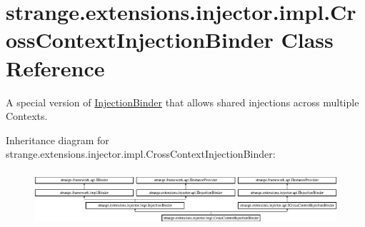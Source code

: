 \hypertarget{classstrange_1_1extensions_1_1injector_1_1impl_1_1_cross_context_injection_binder}{\section{strange.\-extensions.\-injector.\-impl.\-Cross\-Context\-Injection\-Binder Class Reference}
\label{classstrange_1_1extensions_1_1injector_1_1impl_1_1_cross_context_injection_binder}
}


A special version of \hyperlink{classstrange_1_1extensions_1_1injector_1_1impl_1_1_injection_binder}{Injection\-Binder} that allows shared injections across multiple Contexts.  


Inheritance diagram for strange.\-extensions.\-injector.\-impl.\-Cross\-Context\-Injection\-Binder\-:\begin{figure}[H]
\begin{center}
\leavevmode
\includegraphics[height=2.074074cm]{classstrange_1_1extensions_1_1injector_1_1impl_1_1_cross_context_injection_binder}
\end{center}
\end{figure}
